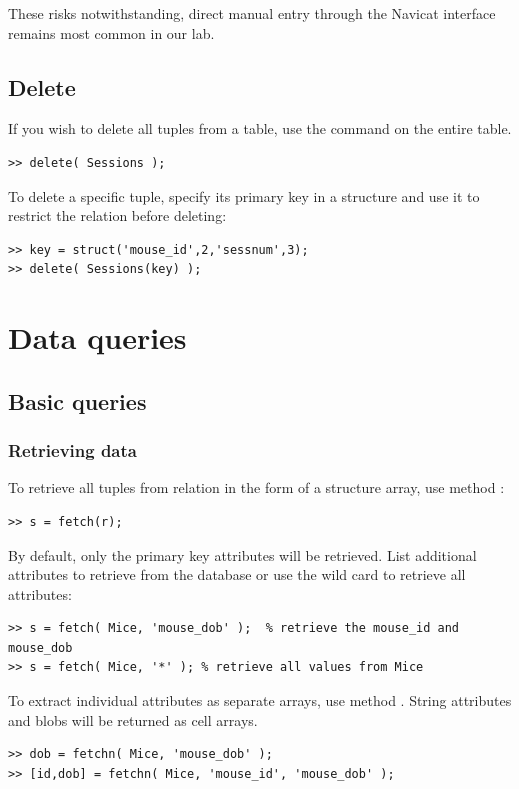 \documentclass[10pt]{article}
\begin{document}
These risks notwithstanding, direct manual entry through the Navicat interface remains most common in our lab. 

\subsection{Delete}
If you wish to delete all tuples from a table, use the  command on the entire table. 
\begin{lstlisting}
>> delete( Sessions );
\end{lstlisting}

To delete a specific tuple, specify its primary key in a structure and use it to restrict the relation before deleting:
\begin{lstlisting}
>> key = struct('mouse_id',2,'sessnum',3);
>> delete( Sessions(key) );
\end{lstlisting}

\section{Data queries}

\subsection{Basic queries}
\subsubsection{Retrieving data}\label{sec:fetch}
To retrieve all tuples from relation  in the form of a structure array, use method :
\begin{lstlisting}
>> s = fetch(r);
\end{lstlisting}

By default, only the primary key attributes will be retrieved.  List additional attributes to retrieve from the database or use the wild card   to retrieve all attributes:
\begin{lstlisting}
>> s = fetch( Mice, 'mouse_dob' );  % retrieve the mouse_id and mouse_dob
>> s = fetch( Mice, '*' ); % retrieve all values from Mice
\end{lstlisting}

To extract individual attributes as separate arrays, use method .  String attributes and blobs will be returned as cell arrays.
\begin{lstlisting}
>> dob = fetchn( Mice, 'mouse_dob' );
>> [id,dob] = fetchn( Mice, 'mouse_id', 'mouse_dob' );
\end{lstlisting}
\end{document}
